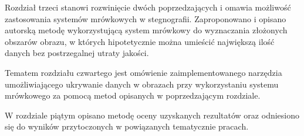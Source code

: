 {    Rozdział trzeci stanowi rozwinięcie dwóch poprzedzających i omawia możliwość zastosowania systemów mrówkowych w
    stegnografii. Zaproponowano i opisano autorską metodę wykorzystującą system mrówkowy do wyznaczania złożonych
    obszarów obrazu, w których hipotetycznie można umieścić największą ilość danych bez postrzegalnej utraty jakości.

    Tematem rozdziału czwartego jest omówienie zaimplementowanego narzędzia umożliwiającego ukrywanie danych w obrazach
    przy wykorzystaniu systemu mrówkowego za pomocą metod opisanych w poprzedzającym rozdziale.

    W rozdziale piątym opisano metodę oceny uzyskanych rezultatów oraz odniesiono się do wyników przytoczonych w
    powiązanych tematycznie pracach.
}


